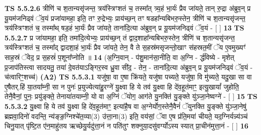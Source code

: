 \documentclass[17pt]{extarticle}
\begin{document}
                  \newline
                                \textbf{ TS 5.5.2.6} \newline
                  त्रीणि॑ च श॒तान्यसृ॑जन्त॒ त्रय॑स्त्रिꣳशतं च॒ तस्मा᳚त् त्र्य॒हं भा॒र्यः॑ प्रैव जा॑यते॒ तान् रु॒द्रा अ॑ब्रुव॒न् प्र यू॒यम॑जनिढ्वं ॅव॒यं प्रजा॑यामहा॒ इति॒ तꣳ रु॒द्रेभ्यः॒ प्राय॑च्छ॒न् तꣳ षडहा᳚न्यबिभरु॒स्तेन॒ त्रीणि॑ च श॒तान्यसृ॑जन्त॒ त्रय॑स्त्रिꣳशतं च॒ तस्मा᳚थ् षड॒हं भा॒र्यः॑ प्रैव जा॑यते॒ ताना॑दि॒त्या अ॑ब्रुव॒न् प्र यू॒यम॑जनिढ्वं ॅव॒यं - [  ] \textbf{  13} \newline
                  \newline
                                \textbf{ TS 5.5.2.7} \newline
                  प्र जा॑यामहा॒ इति॒ तमा॑दि॒त्येभ्यः॒ प्राय॑च्छ॒न् तं द्वाद॒शाहा᳚न्यबिभरु॒स्तेन॒ त्रीणि॑ च श॒तान्यसृ॑जन्त॒ त्रय॑स्त्रिꣳशतं च॒ तस्मा᳚द् द्वादशा॒हं भा॒र्यः॑ प्रैव जा॑यते॒ तेन॒ वै ते स॒हस्र॑मसृजन्तो॒खाꣳ स॑हस्रत॒मीं ॅय ए॒वमुख्यꣳ॑ साह॒स्रं ॅवेद॒ प्र स॒हस्रं॑ प॒शूना᳚प्नोति ॥ \textbf{  14} \newline
                  \newline
                      (अ॒ग्नि॒वान् - प॑शु॒मान॑सा॒नीति॒ वा अ॒ग्नि - र्द्ध॑विष्ये - मृशेत् प्र॒जाप॑तिस्त्वा सादयतु॒ तया॑ दे॒वत॑याऽङ्गिर॒स्व ध्रु॒वा सी॑द॒ - तेन॒ - ताना॑दि॒त्या अ॑ब्रुव॒न् प्र यू॒यम॑जनिढ्वं ॅव॒यं - च॑त्वारिꣳ॒॒शच्च॑)  \textbf{(A2)} \newline \newline
                                        \textbf{ TS 5.5.3.1} \newline
                  यजु॑षा॒ वा ए॒षा क्रि॑यते॒ यजु॑षा पच्यते॒ यजु॑षा॒ वि मु॑च्यते॒ यदु॒खा सा वा ए॒षैतर्.हि॑ या॒तया᳚म्नी॒ सा न पुनः॑ प्र॒युज्येत्या॑हु॒रग्ने॑ यु॒क्ष्वा हि ये तव॑ यु॒क्ष्वा हि दे॑व॒हूत॑माꣳ॒॒ इत्यु॒खायां᳚ जुहोति॒ तेनै॒वैनां॒ पुनः॒ प्रयु॑ङ्क्ते॒ तेनाया॑तयाम्नी॒ यो वा अ॒ग्निं ॅयोग॒ आग॑ते यु॒नक्ति॑ यु॒ङ्क्ते यु॑ञ्जा॒नेष्वग्ने॑ - [  ] \textbf{  15} \newline
                  \newline
                                \textbf{ TS 5.5.3.2} \newline
                  यु॒क्ष्वा हि ये तव॑ यु॒क्ष्वा हि दे॑व॒हूत॑माꣳ॒॒ इत्या॑है॒ष वा अ॒ग्नेर्योग॒स्तेनै॒वैनं॑ ॅयुनक्ति यु॒ङ्क्ते यु॑ञ्जा॒नेषु॑ ब्रह्मवा॒दिनो॑ वदन्ति॒ न्य॑ङ्ङ॒ग्निश्चे॑त॒व्या(3) उ॑त्ता॒ना(3) इति॒ वय॑सां॒ ॅवा ए॒ष प्र॑ति॒मया॑ चीयते॒ यद॒ग्निर्यन्न्य॑ञ्चं चिनु॒यात् पृ॑ष्टि॒त ए॑न॒माहु॑तय ऋच्छेयु॒र्यदु॑त्ता॒नं न पति॑तुꣳ शक्नुया॒दसु॑वर्ग्योऽस्य स्यात् प्रा॒चीन॑मुत्ता॒नं - [  ] \textbf{  16} \newline
\end{document}
